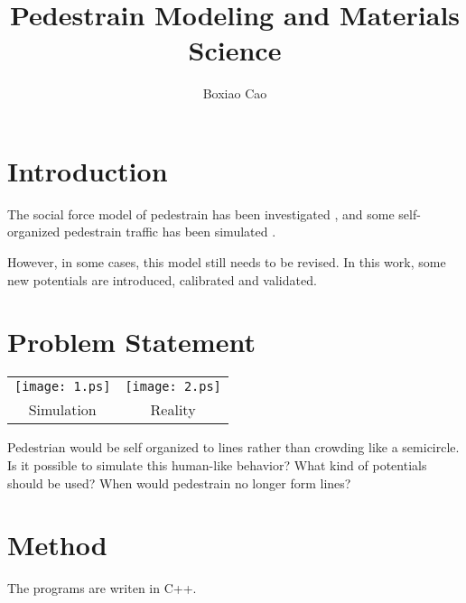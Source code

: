 \documentclass{article}
\begin{document}
	\title{Pedestrain Modeling and Materials Science}
	\author{Boxiao Cao}
	\maketitle
	\section{Introduction}
		The social force model of pedestrain has been investigated \cite{helbing1995social,helbing1998generalized},
		and some self-organized pedestrain traffic has been simulated \cite{helbing2005self}.

		However, in some cases, this model still needs to be revised. In this work, some new potentials are introduced, calibrated and validated.

	\section{Problem Statement}

		\begin{tabular}{cc}
			\texttt{[image: 1.ps]} & \texttt{[image: 2.ps]} \\
			Simulation & Reality \\
		\end{tabular}

		Pedestrian would be self organized to lines rather than crowding like a semicircle.
		Is it possible to simulate this human-like behavior? What kind of potentials should be used?
		When would pedestrain no longer form lines?

	\section{Method}
		The programs are writen in C++.
	\renewcommand\refname{Reference}
	
\end{document}
